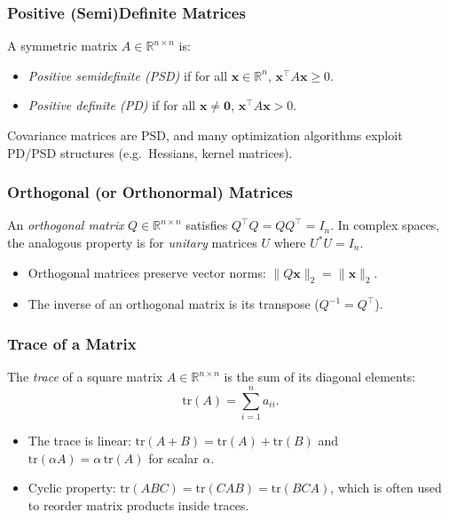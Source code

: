 \begin{itemize}
\subsubsection{Positive (Semi)Definite Matrices}
A symmetric matrix $A \in \mathbb{R}^{n \times n}$ is:
\begin{itemize}
    \item \emph{Positive semidefinite (PSD)} if for all $\mathbf{x} \in \mathbb{R}^n$, 
          $\mathbf{x}^\top A \mathbf{x} \ge 0$.
    \item \emph{Positive definite (PD)} if for all $\mathbf{x} \neq \mathbf{0}$, 
          $\mathbf{x}^\top A \mathbf{x} > 0$. 
\end{itemize}
Covariance matrices are PSD, and many optimization algorithms exploit PD/PSD structures (e.g.\ Hessians, kernel matrices).

\subsubsection{Orthogonal (or Orthonormal) Matrices}
An \emph{orthogonal matrix} $Q \in \mathbb{R}^{n \times n}$ satisfies $Q^\top Q = QQ^\top = I_n$. 
In complex spaces, the analogous property is for \emph{unitary} matrices $U$ where $U^* U = I_n$. 
\begin{itemize}
    \item Orthogonal matrices preserve vector norms: $\|Q \mathbf{x}\|_2 = \|\mathbf{x}\|_2$.
    \item The inverse of an orthogonal matrix is its transpose ($Q^{-1} = Q^\top$).
\end{itemize}

\subsubsection{Trace of a Matrix}
The \emph{trace} of a square matrix $A \in \mathbb{R}^{n \times n}$ is the sum of its diagonal elements:
\[
\text{tr}(A) = \sum_{i=1}^n a_{ii}.
\]
\begin{itemize}
    \item The trace is linear: $\text{tr}(A+B) = \text{tr}(A) + \text{tr}(B)$ and 
          $\text{tr}(\alpha A) = \alpha \, \text{tr}(A)$ for scalar $\alpha$.
    \item Cyclic property: $\text{tr}(ABC) = \text{tr}(CAB) = \text{tr}(BCA)$, 
          which is often used to reorder matrix products inside traces.
\end{itemize}


\end{itemize}
